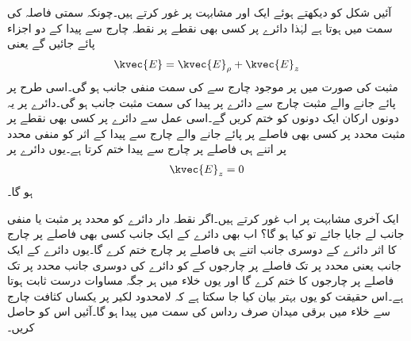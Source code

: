 آئیں شکل  کو دیکھتے ہوئے  ایک اور مشابہت پر غور کرتے ہیں۔چونکہ  سمتی فاصلہ  کی سمت میں ہوتا ہے لہٰذا دائرے پر کسی بھی نقطے پر نقطہ چارج  سے پیدا   کے دو اجزاء پائے جائیں گے یعنی
\begin{align}
\kvec{E}=\kvec{E}_\rho+\kvec{E}_z
\end{align}
مثبت  کی صورت میں  پر موجود چارج سے   کی سمت منفی   جانب ہو گی۔اسی طرح  پر پائے جانے والے مثبت چارج سے دائرے پر پیدا  کی سمت مثبت  جانب ہو گی۔دائرے پر یہ دونوں ارکان ایک دونوں کو ختم کریں گے۔اسی عمل سے دائرے پر کسی بھی نقطے پر مثبت  محدد پر کسی  بھی  فاصلے پر پائے جانے والے چارج سے پیدا  کے اثر کو منفی  محدد پر اتنے ہی فاصلے پر چارج سے پیدا   ختم کرتا ہے۔یوں دائرے پر
\begin{align}\label{مساوات_کولومب_لامحدود_چارج_رداس_کا_میدان_صفر}
\kvec{E}_z=0
\end{align}
ہو گا۔

ایک آخری مشابہت پر اب غور کرتے ہیں۔اگر نقطہ دار دائرے کو  محدد پر مثبت یا منفی جانب  لے جایا جائے تو کیا ہو گا؟ اب بھی دائرے  کے ایک جانب کسی بھی فاصلے پر چارج کا اثر دائرے کے دوسری جانب اتنے ہی فاصلے پر چارج ختم کرے گا۔یوں دائرے کے ایک جانب یعنی  محدد پر  تک فاصلے پر چارجوں کے  کو دائرے کی دوسری جانب  محدد پر  تک فاصلے پر چارجوں کا  ختم کرے گا اور یوں خلاء میں  ہر جگہ مساوات  درست ثابت ہوتا ہے۔اس حقیقت کو یوں بہتر بیان کیا جا سکتا ہے کہ  لامحدود لکیر پر یکساں کثافت چارج  سے خلاء میں برقی میدان صرف رداس کی سمت میں پیدا ہو گا۔آئیں  اس  کو حاصل کریں۔

